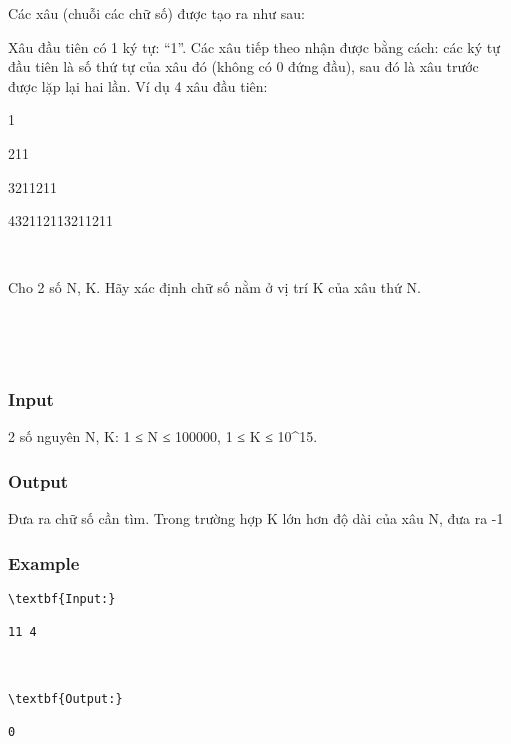 

Các xâu (chuỗi các chữ số) được tạo ra như sau:

Xâu đầu tiên có 1 ký tự: “1”. Các xâu tiếp theo nhận được bằng cách: các ký tự đầu tiên là số thứ tự của xâu đó (không có 0 đứng đầu), sau đó là xâu trước được lặp lại hai lần. Ví dụ 4 xâu đầu tiên:

1

211

3211211

432112113211211

 

Cho 2 số N, K. Hãy xác định chữ số nằm ở vị trí K của xâu thứ N.

 

 

\subsubsection{Input}

2 số nguyên N, K: 1 ≤ N ≤ 100000, 1 ≤ K ≤ 10\textasciicircum15.

\subsubsection{Output}

Đưa ra chữ số cần tìm. Trong trường hợp K lớn hơn độ dài của xâu N, đưa ra -1

\subsubsection{Example}
\begin{verbatim}
\textbf{Input:}

11 4



\textbf{Output:}

0\end{verbatim}